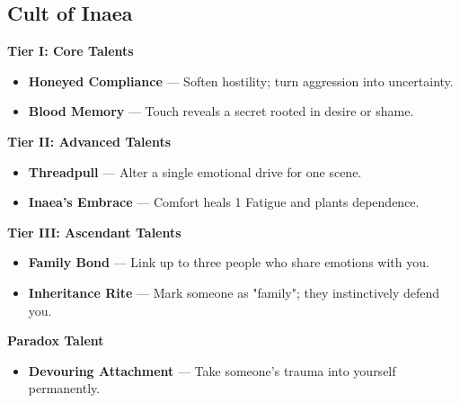 \documentclass[11pt]{book}
\begin{document}
\subsection*{Cult of Inaea}
\begin{tcolorbox}[colback=mistgray!10,colframe=shadowviolet,title={Cult of Inaea --- Talents}]

\textbf{Tier I: Core Talents}
\begin{itemize}[noitemsep]
  \item \textbf{Honeyed Compliance} --- Soften hostility; turn aggression into uncertainty.
  \item \textbf{Blood Memory} --- Touch reveals a secret rooted in desire or shame.
\end{itemize}

\textbf{Tier II: Advanced Talents}
\begin{itemize}[noitemsep]
  \item \textbf{Threadpull} --- Alter a single emotional drive for one scene.
  \item \textbf{Inaea's Embrace} --- Comfort heals 1 Fatigue and plants dependence.
\end{itemize}

\textbf{Tier III: Ascendant Talents}
\begin{itemize}[noitemsep]
  \item \textbf{Family Bond} --- Link up to three people who share emotions with you.
  \item \textbf{Inheritance Rite} --- Mark someone as "family"; they instinctively defend you.
\end{itemize}

\textbf{Paradox Talent}
\begin{itemize}[noitemsep]
  \item \textbf{Devouring Attachment} --- Take someone's trauma into yourself permanently.
\end{itemize}

\end{tcolorbox}

\end{document}
